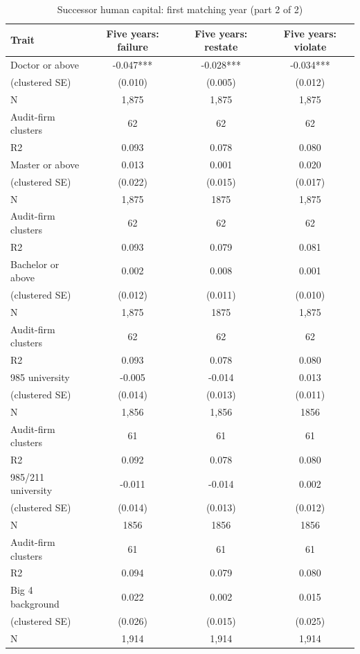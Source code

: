 \begin{table}[htbp]
\footnotesize
\centering
\caption{Successor human capital: first matching year (part 2 of 2)}
\begin{threeparttable}
\begin{tabular}{p{}ccc}
\toprule
Trait & Five years: failure & Five years: restate & Five years: violate \\
\midrule
Doctor or above & -0.047*** & -0.028*** & -0.034*** \\
(clustered SE) & (0.010) & (0.005) & (0.012) \\
N & 1,875 & 1,875 & 1,875 \\
Audit-firm clusters & 62 & 62 & 62 \\
R2 & 0.093 & 0.078 & 0.080 \\
Master or above & 0.013 & 0.001 & 0.020 \\
(clustered SE) & (0.022) & (0.015) & (0.017) \\
N & 1,875 & 1875 & 1,875 \\
Audit-firm clusters & 62 & 62 & 62 \\
R2 & 0.093 & 0.079 & 0.081 \\
Bachelor or above & 0.002 & 0.008 & 0.001 \\
(clustered SE) & (0.012) & (0.011) & (0.010) \\
N & 1,875 & 1875 & 1,875 \\
Audit-firm clusters & 62 & 62 & 62 \\
R2 & 0.093 & 0.078 & 0.080 \\
985 university & -0.005 & -0.014 & 0.013 \\
(clustered SE) & (0.014) & (0.013) & (0.011) \\
N & 1,856 & 1,856 & 1856 \\
Audit-firm clusters & 61 & 61 & 61 \\
R2 & 0.092 & 0.078 & 0.080 \\
985/211 university & -0.011 & -0.014 & 0.002 \\
(clustered SE) & (0.014) & (0.013) & (0.012) \\
N & 1856 & 1856 & 1856 \\
Audit-firm clusters & 61 & 61 & 61 \\
R2 & 0.094 & 0.079 & 0.080 \\
Big 4 background & 0.022 & 0.002 & 0.015 \\
(clustered SE) & (0.026) & (0.015) & (0.025) \\
N & 1,914 & 1,914 & 1,914 \\

\end{tabular}
\end{threeparttable}
\end{table}
